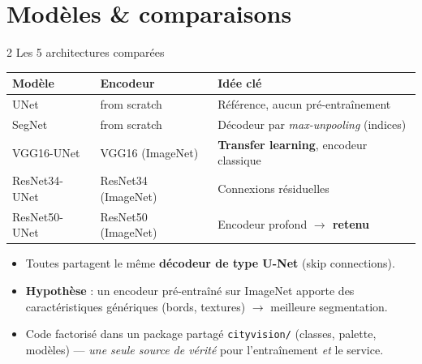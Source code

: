 \documentclass[aspectratio=169,11pt]{beamer}
\newcommand{\emphc}[1]{\textbf{\color{cvblue}#1}}
\newcommand{\code}[1]{\texttt{\small #1}}
\begin{document}
\section{Modèles \& comparaisons}
\begin{frame}{2 \textbar{} Les 5 architectures comparées}
  \centering
  \renewcommand{\arraystretch}{1.3}
  \begin{tabular}{@{}lll@{}}
    \toprule
    \textbf{Modèle} & \textbf{Encodeur} & \textbf{Idée clé} \\
    \midrule
    UNet          & from scratch          & Référence, aucun pré-entraînement \\
    SegNet        & from scratch          & Décodeur par \emph{max-unpooling} (indices) \\
    VGG16-UNet    & VGG16 (ImageNet)      & \emphc{Transfer learning}, encodeur classique \\
    ResNet34-UNet & ResNet34 (ImageNet)   & Connexions résiduelles \\
    \rowcolor{cvgreen!18}
    ResNet50-UNet & ResNet50 (ImageNet)   & Encodeur profond \textbf{$\rightarrow$ retenu} \\
    \bottomrule
  \end{tabular}
  \vspace{0.8em}
  \begin{itemize}\footnotesize
    \item Toutes partagent le même \emphc{décodeur de type U-Net} (skip connections).
    \item \emphc{Hypothèse} : un encodeur pré-entraîné sur ImageNet apporte des
      caractéristiques génériques (bords, textures) $\rightarrow$ meilleure segmentation.
    \item Code factorisé dans un package partagé \code{cityvision/} (classes, palette, modèles)
      — \emph{une seule source de vérité} pour l'entraînement \emph{et} le service.
  \end{itemize}
\end{frame}
\end{document}
